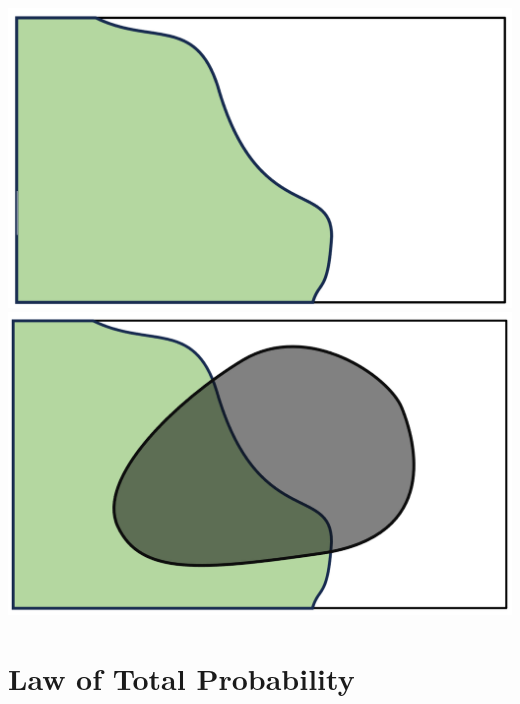 \documentclass[compress]{beamer}
\begin{document}
\begin{frame}
\includegraphics[scale=.25]{figs/TwoSetPartionS.png}\pause
\includegraphics[scale=.27]{figs/Law_of_Total_Probability_Simple.png}
\vspace{1.5in}
\end{frame}



\section{Law of Total Probability}
\end{document}
